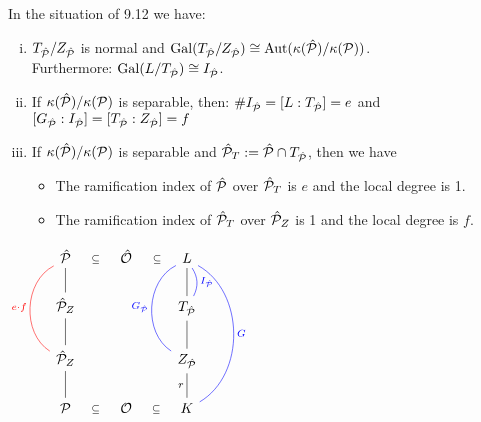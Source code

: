 \begin{Prop}
In the situation of 9.12 we have:
\begin{enumerate}[i)]
\item $T_{\hat{\mathcal{P}}}/Z_{\hat{\mathcal{P}}}$ is normal and $\operatorname{Gal}(T_{\hat{\mathcal{P}}}/Z_{\hat{\mathcal{P}}}) \cong \operatorname{Aut}(\kappa(\hat{\mathcal{P}})/\kappa(\mathcal{P}))$.\\ Furthermore: $\operatorname{Gal}(L/T_{\hat{\mathcal{P}}}) \cong I_{\hat{\mathcal{P}}}$.
\item If $\kappa(\hat{\mathcal{P}})/\kappa(\mathcal{P})$ is separable, then: $\#I_{\hat{\mathcal{P}}} = [L:T_{\hat{\mathcal{P}}}]=e$ and $[G_{\hat{\mathcal{P}}}:I_{\hat{\mathcal{P}}}]=[T_{\hat{\mathcal{P}}}:Z_{\hat{\mathcal{P}}}]=f$
\item If $\kappa(\hat{\mathcal{P}})/\kappa(\mathcal{P})$ is separable and $\hat{\mathcal{P}}_T:=\hat{\mathcal{P}} \cap T_{\hat{\mathcal{P}}}$, then we have
\begin{itemize}
\item The ramification index of $\hat{\mathcal{P}}$ over $\hat{\mathcal{P}}_T$ is $e$ and the local degree is 1.
\item The ramification index of $\hat{\mathcal{P}}_T$ over $\hat{\mathcal{P}}_Z$ is 1 and the local degree is $f$.
\end{itemize}
\end{enumerate}
\end{Prop}

$ \begin{tikzcd}
\hP \arrow[draw=none]{r}[sloped,auto=false]{\subseteq} & \hO \arrow[draw=none]{r}[sloped,auto=false]{\subseteq} & L\\
\hP_Z \arrow[dash]{u}&	& T_{\hP} \arrow[dash]{u} \arrow[dash, bend right=30, color=blue]{u}[right]{I_{\hP}}\\
\hP_Z \arrow[dash]{u} \arrow[dash, bend left=60, color=red]{uu}[left]{e\cdot f}&	& \ZP \arrow[dash]{u} \arrow[dash, bend left=60, color=blue]{uu}[left]{\GP}\\
\PP \arrow[dash]{u} \arrow[draw=none]{r}[sloped,auto=false]{\subseteq}&\O \arrow[draw=none]{r}[sloped,auto=false]{\subseteq}& K \arrow[dash]{u}{r} \arrow[dash, bend right=60, color=blue]{uuu}[right]{G}
\end{tikzcd}
$


